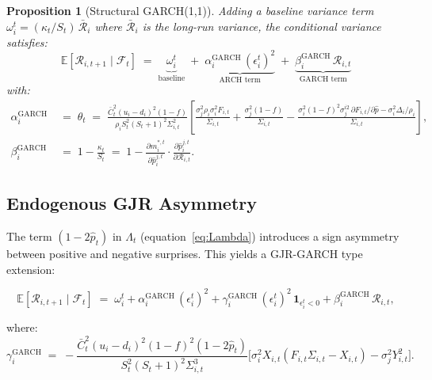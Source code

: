 \documentclass[12pt,a4paper]{article}
\newtheorem{proposition}{Proposition}[section]
\newcommand{\E}{\mathbb{E}}
\newcommand{\1}{\mathbf{1}}
\begin{document}
\begin{proposition}[Structural GARCH(1,1)]
Adding a baseline variance term $\omega_i^t = (\kappa_t/S_t)\,\bar{\mathcal{R}}_i$ where $\bar{\mathcal{R}}_i$ is the long-run variance, the conditional variance satisfies:
\begin{equation}
  \boxed{
    \E[\mathcal{R}_{i,t+1}\mid\mathcal{F}_t]
    \;=\;
    \underbrace{\omega_i^t}_{\text{baseline}}
    \;+\;
    \underbrace{\alpha_i^{\mathrm{GARCH}}\,(\epsilon_i^t)^2}_{\text{ARCH term}}
    \;+\;
    \underbrace{\beta_i^{\mathrm{GARCH}}\,\mathcal{R}_{i,t}}_{\text{GARCH term}}
  }
  \label{eq:garch11}
\end{equation}
with:
\begin{align}
  \alpha_i^{\mathrm{GARCH}} &\;=\; \theta_t
  \;=\; \frac{\bar{C}_t^2(u_i-d_i)^2(1-f)}{\rho_i S_t^2(S_t+1)^2\Sigma_{i,t}^2}
  \left[
    \frac{\sigma_j^2\rho_i\sigma_i^2 F_{i,t}}{\Sigma_{i,t}}
    + \frac{\sigma_j^2(1-f)}{\Sigma_{i,t}}
    - \frac{\sigma_i^2(1-f)^2\sigma_j^{i2}\,\partial F_{i,t}/\partial\hat{p} - \sigma_i^2\Delta_i/\rho_i}{\Sigma_{i,t}}
  \right],
  \label{eq:alpha_garch}\\[6pt]
  \beta_i^{\mathrm{GARCH}} &\;=\; 1 - \frac{\kappa_t}{S_t}
  \;=\; 1 - \frac{\partial m_i^{*,t}}{\partial \hat{p}_i^{j,t}}\cdot\frac{\partial \hat{p}_i^{j,t}}{\partial \mathcal{R}_{i,t}}.
  \label{eq:beta_garch}
\end{align}
\end{proposition}

\subsection{Endogenous GJR Asymmetry}

The term $(1-2\hat{p}_t)$ in $\Lambda_t$ (equation~\eqref{eq:Lambda}) introduces a sign asymmetry between positive and negative surprises. This yields a GJR-GARCH type extension:

\begin{equation}
  \E[\mathcal{R}_{i,t+1}\mid\mathcal{F}_t]
  \;=\;
  \omega_i^t
  + \alpha_i^{\mathrm{GARCH}}\,(\epsilon_i^t)^2
  + \gamma_i^{\mathrm{GARCH}}\,(\epsilon_i^t)^2\,\1_{\epsilon_i^t < 0}
  + \beta_i^{\mathrm{GARCH}}\,\mathcal{R}_{i,t},
  \label{eq:gjr_garch}
\end{equation}

where:
\begin{equation}
  \gamma_i^{\mathrm{GARCH}}
  \;=\;
  -\frac{\bar{C}_t^2(u_i-d_i)^2(1-f)^2(1-2\hat{p}_t)}
        {S_t^2(S_t+1)^2\Sigma_{i,t}^3}
  \bigl[\sigma_i^2 X_{i,t}(F_{i,t}\Sigma_{i,t}-X_{i,t}) - \sigma_j^2 Y_{i,t}^2\bigr].
  \label{eq:gamma_garch}
\end{equation}
\end{document}
